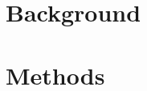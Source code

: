 \documentclass{bmcart}
\begin{document}
\begin{frontmatter}


\begin{abstractbox}

\begin{abstract} %

\end{abstract}

\end{abstractbox}
\end{frontmatter}


% 



\section{Background}\label{sec:intro}



\section{Methods}\label{sec:meth}









% 


% 
% 
% 
\end{document}
